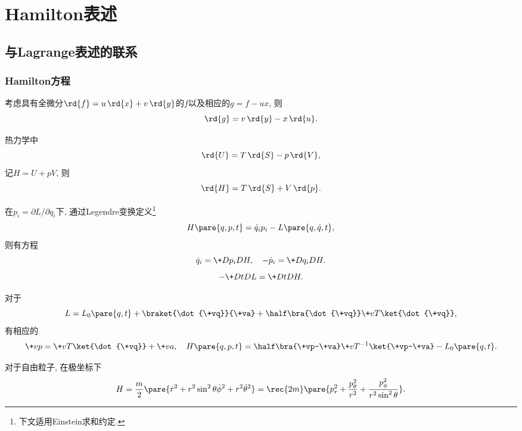\documentclass[../TheoreticalMechanics.tex]{subfiles}
\begin{document}
\section{Hamilton表述} %
\label{sec:hamilton表述}

\subsection{与Lagrange表述的联系} %
\label{sub:与lagrange表述的联系}

\subsubsection{Hamilton方程} %
\label{ssub:hamilton方程}

\begin{lemma}[Legendre变换]
    考虑具有全微分$\rd{f} = u\,\rd{x} + v\,\rd{y}$的$f$以及相应的$g = f-ux$, 则
    \[ \rd{g} = v\,\rd{y} - x\,\rd{u}. \]
\end{lemma}
\begin{ex}
    热力学中
    \[ \rd{U} = T\,\rd{S} - p\,\rd{V}, \]
    记$H = U + pV$, 则
    \[ \rd{H} = T\,\rd{S} + V\,\rd{p}. \]
\end{ex}
\begin{finale}
    \begin{theorem}[Hamilton方程]
        在$p_i = \partial L/\partial q_i$下, 通过Legendre变换定义\footnote{下文适用Einstein求和约定.}
        \[ H\pare{q, p, t} = \dot{q}_ip_i - L\pare{q,\dot{q},t}, \]
        则有方程
        \begin{equation}
            \label{eq:Hamilton方程}
            \dot{q}_i = \+D{p_i}DH,\quad -\dot{p}_i = \+D{q_i}DH. 
        \end{equation}
        \[ -\+DtDL = \+DtDH. \]
    \end{theorem}
\end{finale}
\begin{lemma}[特殊形式的Hamilton量]
    对于
    \[ L = L_0\pare{q,t} + \braket{\dot{\+vq}}{\+va} + \half \bra{\dot{\+vq}}\+vT\ket{\dot{\+vq}}, \]
    有相应的
    \begin{equation}
        \label{eq:Hamilton量用动量表示}
        \+vp = \+vT\ket{\dot{\+vq}}+\+va,\quad H\pare{q,p,t} = \half\bra{\+vp-\+va}\+vT^{-1}\ket{\+vp-\+va} - L_0\pare{q,t}. 
    \end{equation}
\end{lemma}
\begin{ex}
    对于自由粒子, 在极坐标下
    \[ H = \frac{m}{2}\pare{\dot{r}^2 + r^2\sin^2\theta\dot{\phi}^2 + r^2\dot{\theta}^2} = \rec{2m}\pare{p_r^2 + \frac{p_\theta^2}{r^2} + \frac{p_\phi^2}{r^2\sin^2\theta}}. \]
\end{ex}
\end{document}
